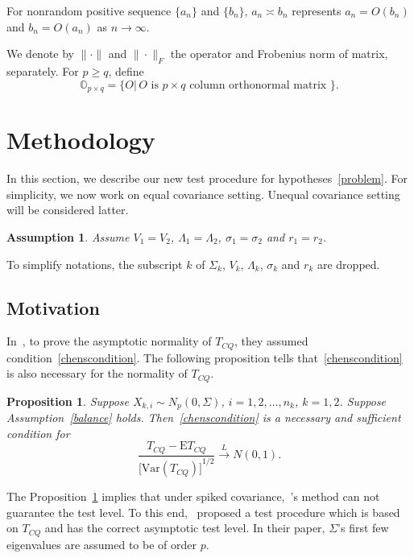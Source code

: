 \documentclass[review]{elsarticle}
\theoremstyle{plain}
\newtheorem{proposition}{\quad\quad Proposition}
\newtheorem{assumption}{\quad\quad Assumption}
\theoremstyle{definition}
\theoremstyle{remark}
\begin{document}
For nonrandom positive sequence $\{a_n\}$ and $\{b_n\}$, $a_n\asymp b_n$ represents $a_n=O(b_n)$ and $b_n=O(a_n)$ as $n\to \infty$.

We denote by $\|\cdot \|$ and $\|\cdot\|_F$ the operator and Frobenius  norm of matrix, separately.
For $p\geq q$, define
\begin{equation*}
\mathbb{O}_{p\times q}=\{O|\, \textrm{$O$ is $p\times q$ column orthonormal matrix }\}.
\end{equation*}

\section{Methodology}

In this section, we describe our new test procedure for hypotheses~\eqref{problem}. For simplicity, we now work on equal covariance setting. Unequal covariance setting will be considered latter.
\begin{assumption}\label{theModel2}
Assume $V_1=V_2$, $\Lambda_1=\Lambda_2$, $\sigma_1=\sigma_2$ and $r_1=r_2$.
\end{assumption}

To simplify notations, the subscript $k$ of $\Sigma_k$, $V_k$, $\Lambda_k$, $\sigma_k$ and $r_k$ are dropped.

\subsection{Motivation}

    In~\cite{Chen2010A}, to prove the asymptotic normality of $T_{CQ}$, they assumed condition~\eqref{chenscondition}.
    The following proposition tells that~\eqref{chenscondition} is also necessary for the normality of $T_{CQ}$.
\begin{proposition}\label{newIf}
    Suppose $X_{k,i}\sim N_p(0,\Sigma)$, $i=1,2,\ldots,n_k$, $k=1,2$. Suppose Assumption~\ref{balance} holds.
    Then~\eqref{chenscondition} is a necessary and sufficient condition for 
    \begin{equation}
        \frac{T_{CQ}-\mathrm{E}T_{CQ}}{{\big[\mathrm{Var}(T_{CQ})\big]}^{1/2}}\xrightarrow{L}N(0,1).
    \end{equation}
\end{proposition}
The Proposition~\ref{newIf} implies that under spiked covariance,~\cite{Chen2010A}'s method can not guarantee the test level.
To this end,~\cite{Ma2015A} proposed a test procedure which is based on $T_{CQ}$ and has the correct asymptotic test level.
In their paper, $\Sigma$'s first few eigenvalues are assumed to be of order $p$.
\end{document}
